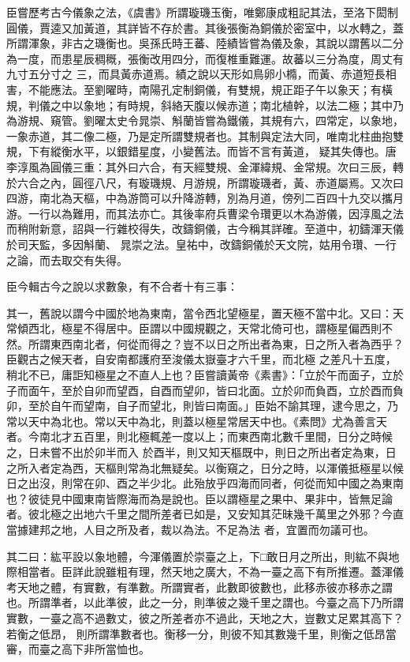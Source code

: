 \begin{pinyinscope}
 臣嘗歷考古今儀象之法，《虞書》所謂璇璣玉衡，唯鄭康成粗記其法，至洛下閎制圓儀，賈逵又加黃道，其詳皆不存於書。其後張衡為銅儀於密室中，以水轉之，蓋所謂渾象，非古之璣衡也。吳孫氏時王蕃、陸績皆嘗為儀及象，其說以謂舊以二分為一度，而患星辰稠穊，張衡改用四分，而復椎重難運。故蕃以三分為度，周丈有九寸五分寸之
 三，而具黃赤道焉。績之說以天形如鳥卵小橢，而黃、赤道短長相害，不能應法。至劉曜時，南陽孔定制銅儀，有雙規，規正距子午以象天；有橫規，判儀之中以象地；有時規，斜絡天腹以候赤道；南北植幹，以法二極；其中乃為游規、窺管。劉曜太史令晁崇、斛蘭皆嘗為鐵儀，其規有六，四常定，以象地，一象赤道，其二像二極，乃是定所謂雙規者也。其制與定法大同，唯南北柱曲抱雙規，下有縱衡水平，以銀錯星度，小變舊法。而皆不言有黃道，
 疑其失傳也。唐李淳風為圓儀三重：其外曰六合，有天經雙規、金渾緯規、金常規。次曰三辰，轉於六合之內，圓徑八尺，有璇璣規、月游規，所謂璇璣者，黃、赤道屬焉。又次曰四游，南北為天樞，中為游筒可以升降游轉，別為月道，傍列二百四十九交以攜月游。一行以為難用，而其法亦亡。其後率府兵曹梁令瓚更以木為游儀，因淳風之法而稍附新意，詔與一行雜校得失，改鑄銅儀，古今稱其詳確。至道中，初鑄渾天儀於司天監，多因斛蘭、
 晁崇之法。皇祐中，改鑄銅儀於天文院，姑用令瓚、一行之論，而去取交有失得。



 臣今輯古今之說以求數象，有不合者十有三事：



 其一，舊說以謂今中國於地為東南，當令西北望極星，置天極不當中北。又曰：天常傾西北，極星不得居中。臣謂以中國規觀之，天常北倚可也，謂極星偏西則不然。所謂東西南北者，何從而得之？豈不以日之所出者為東，日之所入者為西乎？臣觀古之候天者，自安南都護府至浚儀太嶽臺才六千里，而北極
 之差凡十五度，稍北不已，庸詎知極星之不直人上也？臣嘗讀黃帝《素書》：「立於午而面子，立於子而面午，至於自卯而望酉，自酉而望卯，皆曰北面。立於卯而負酉，立於酉而負卯，至於自午而望南，自子而望北，則皆曰南面。」臣始不諭其理，逮今思之，乃常以天中為北也。常以天中為北，則蓋以極星常居天中也。《素問》尤為善言天者。今南北才五百里，則北極輒差一度以上；而東西南北數千里間，日分之時候之，日未嘗不出於卯半而入
 於酉半，則又知天樞既中，則日之所出者定為東，日之所入者定為西，天樞則常為北無疑矣。以衡窺之，日分之時，以渾儀抵極星以候日之出沒，則常在卯、酉之半少北。此殆放乎四海而同者，何從而知中國之為東南也？彼徒見中國東南皆際海而為是說也。臣以謂極星之果中、果非中，皆無足論者。彼北極之出地六千里之間所差者已如是，又安知其茫昧幾千萬里之外邪？今直當據建邦之地，人目之所及者，裁以為法。不足為法
 者，宜置而勿議可也。



 其二曰：紘平設以象地體，今渾儀置於崇臺之上，下□敢日月之所出，則紘不與地際相當者。臣詳此說雖粗有理，然天地之廣大，不為一臺之高下有所推遷。蓋渾儀考天地之體，有實數，有準數。所謂實者，此數即彼數也，此移赤彼亦移赤之謂也。所謂準者，以此準彼，此之一分，則準彼之幾千里之謂也。今臺之高下乃所謂實數，一臺之高不過數丈，彼之所差者亦不過此，天地之大，豈數丈足累其高下？若衡之低昂，
 則所謂準數者也。衡移一分，則彼不知其數幾千里，則衡之低昂當審，而臺之高下非所當恤也。




\end{pinyinscope}
